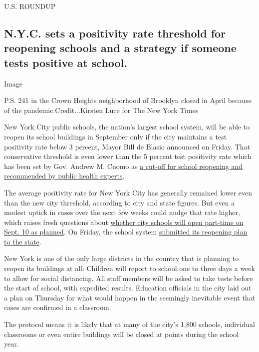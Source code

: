 U.S. ROUNDUP

\hypertarget{nyc-sets-a-positivity-rate-threshold-for-reopening-schools-and-a-strategy-if-someone-tests-positive-at-school}{%
\subsection{N.Y.C. sets a positivity rate threshold for reopening
schools and a strategy if someone tests positive at
school.}\label{nyc-sets-a-positivity-rate-threshold-for-reopening-schools-and-a-strategy-if-someone-tests-positive-at-school}}

Image

P.S. 241 in the Crown Heights neighborhood of Brooklyn closed in April
because of the pandemic.Credit...Kirsten Luce for The New York Times

New York City public schools, the nation's largest school system, will
be able to reopen its school buildings in September only if the city
maintains a test positivity rate below 3 percent, Mayor Bill de Blasio
announced on Friday. That conservative threshold is even lower than the
5 percent test positivity rate which has been set by Gov. Andrew M.
Cuomo as
\href{https://www.nytimes.com/2020/07/14/us/coronavirus-schools-fall.html}{a
cut-off for school reopening and recommended by public health experts}.

The average positivity rate for New York City has generally remained
lower even than the new city threshold, according to city and state
figures. But even a modest uptick in cases over the next few weeks could
nudge that rate higher, which raises fresh questions about
\href{https://www.nytimes.com/2020/07/08/nyregion/nyc-schools-reopening-plan.html}{whether
city schools will open part-time on Sept. 10 as planned}. On Friday, the
school system
\href{https://infohub.nyced.org/docs/default-source/default-document-library/nyc-doe---state-doh-reopening-plan-7-31.pdf}{submitted
its reopening plan to the state}.

New York is one of the only large districts in the country that is
planning to reopen its buildings at all: Children will report to school
one to three days a week to allow for social distancing. All staff
members will be asked to take tests before the start of school, with
expedited results. Education officials in the city laid out a plan on
Thursday for what would happen in the seemingly inevitable event that
cases are confirmed in a classroom.

The protocol means it is likely that at many of the city's 1,800
schools, individual classrooms or even entire buildings will be closed
at points during the school year.

